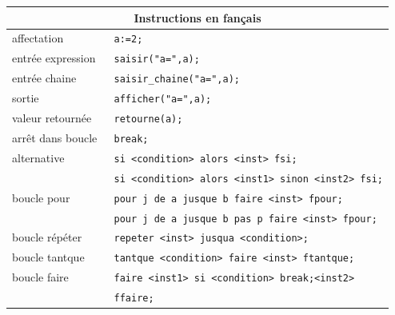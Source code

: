 \documentclass{article}
\begin{document}
\begin{giacjshere}
\begin{center}
\begin{tabular}{|ll|}
\hline
\multicolumn{2}{|c|}{\bf Instructions en fan\c{c}ais}\\
\hline\hline
affectation& \verb| a:=2;|\\
entr\'ee expression& \verb| saisir("a=",a);| \\
entr\'ee chaine& \verb| saisir_chaine("a=",a);| \\
sortie& \verb| afficher("a=",a);|\\
valeur retourn\'ee& \verb| retourne(a);|\\
arr\^et dans boucle& \verb| break;|\\
alternative& \verb| si <condition> alors <inst> fsi;| \\
           &\verb| si <condition> alors <inst1> sinon <inst2> fsi;| \\
boucle pour& \verb| pour j de a jusque b faire <inst> fpour;|\\
           & \verb| pour j de a jusque b pas p faire <inst> fpour;|\\
boucle r\'ep\'eter& \verb| repeter <inst> jusqua <condition>;|\\
boucle tantque& \verb| tantque <condition> faire <inst> ftantque;|\\
boucle faire& \verb| faire <inst1> si <condition> break;<inst2>|\\ 
            &\verb| ffaire;|\\
\hline
\end{tabular}
\end{center}



\end{giacjshere}
\end{document}
